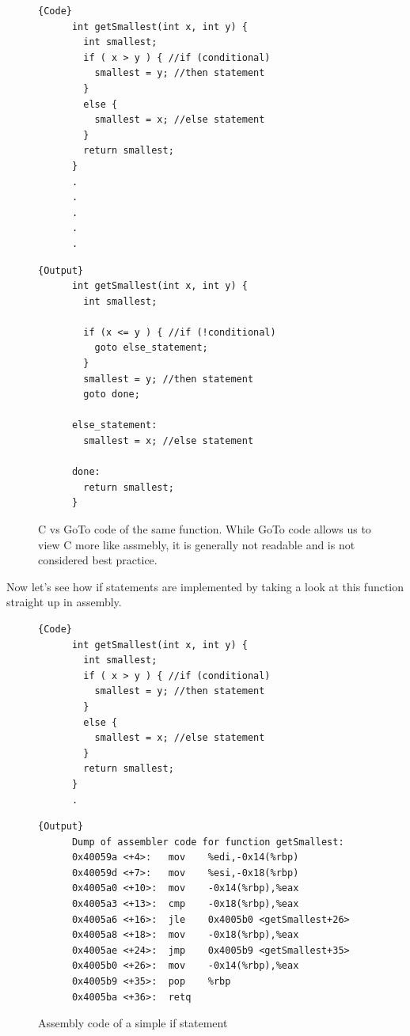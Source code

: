   \begin{figure}[H]
    \centering 
    \noindent\begin{minipage}{.5\textwidth}
    \begin{lstlisting}[]{Code}
      int getSmallest(int x, int y) {
        int smallest;
        if ( x > y ) { //if (conditional)
          smallest = y; //then statement
        }
        else {
          smallest = x; //else statement
        }
        return smallest;
      }
      .
      .
      .
      .
      .
    \end{lstlisting}
    \end{minipage}
    \hfill
    \begin{minipage}{.49\textwidth}
    \begin{lstlisting}[]{Output}
      int getSmallest(int x, int y) {
        int smallest;

        if (x <= y ) { //if (!conditional)
          goto else_statement;
        }
        smallest = y; //then statement
        goto done;

      else_statement:
        smallest = x; //else statement

      done:
        return smallest;
      }      
    \end{lstlisting}
    \end{minipage}
    \caption{C vs GoTo code of the same function. While GoTo code allows us to view C more like assmebly, it is generally not readable and is not considered best practice. } 
    \label{fig:c_vs_goto}
  \end{figure}

  Now let's see how if statements are implemented by taking a look at this function straight up in assembly. 

  \begin{figure}[H]
    \centering 
    \noindent\begin{minipage}{.4\textwidth}
    \begin{lstlisting}[]{Code}
      int getSmallest(int x, int y) {
        int smallest;
        if ( x > y ) { //if (conditional)
          smallest = y; //then statement
        }
        else {
          smallest = x; //else statement
        }
        return smallest;
      }
      .
    \end{lstlisting}
    \end{minipage}
    \hfill
    \begin{minipage}{.59\textwidth}
    \begin{lstlisting}[]{Output}
      Dump of assembler code for function getSmallest:
      0x40059a <+4>:   mov    %edi,-0x14(%rbp)
      0x40059d <+7>:   mov    %esi,-0x18(%rbp)
      0x4005a0 <+10>:  mov    -0x14(%rbp),%eax
      0x4005a3 <+13>:  cmp    -0x18(%rbp),%eax
      0x4005a6 <+16>:  jle    0x4005b0 <getSmallest+26>
      0x4005a8 <+18>:  mov    -0x18(%rbp),%eax
      0x4005ae <+24>:  jmp    0x4005b9 <getSmallest+35>
      0x4005b0 <+26>:  mov    -0x14(%rbp),%eax
      0x4005b9 <+35>:  pop    %rbp
      0x4005ba <+36>:  retq
    \end{lstlisting}
    \end{minipage}
    \caption{Assembly code of a simple if statement} 
    \label{fig:if_statement}
  \end{figure}

